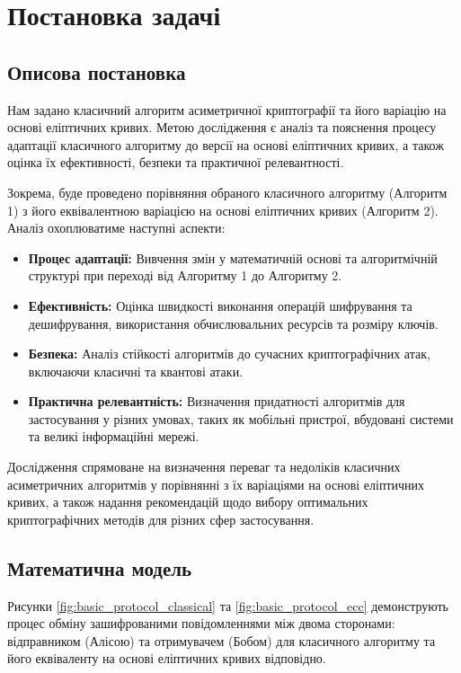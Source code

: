 \documentclass[12pt]{report}
\theoremstyle{definition}
\theoremstyle{plain}
\begin{document}
\chapter{Постановка задачі}

\section{Описова постановка}

Нам задано класичний алгоритм асиметричної криптографії та його варіацію на основі еліптичних кривих. Метою дослідження є аналіз та пояснення процесу адаптації класичного алгоритму до версії на основі еліптичних кривих, а також оцінка їх ефективності, безпеки та практичної релевантності.

Зокрема, буде проведено порівняння обраного класичного алгоритму (Алгоритм 1) з його еквівалентною варіацією на основі еліптичних кривих (Алгоритм 2). Аналіз охоплюватиме наступні аспекти:
\begin{itemize}
    \item \textbf{Процес адаптації:} Вивчення змін у математичній основі та алгоритмічній структурі при переході від Алгоритму 1 до Алгоритму 2.
    \item \textbf{Ефективність:} Оцінка швидкості виконання операцій шифрування та дешифрування, використання обчислювальних ресурсів та розміру ключів.
    \item \textbf{Безпека:} Аналіз стійкості алгоритмів до сучасних криптографічних атак, включаючи класичні та квантові атаки.
    \item \textbf{Практична релевантність:} Визначення придатності алгоритмів для застосування у різних умовах, таких як мобільні пристрої, вбудовані системи та великі інформаційні мережі.
\end{itemize}

Дослідження спрямоване на визначення переваг та недоліків класичних асиметричних алгоритмів у порівнянні з їх варіаціями на основі еліптичних кривих, а також надання рекомендацій щодо вибору оптимальних криптографічних методів для різних сфер застосування.

\section{Математична модель}

Рисунки \ref{fig:basic_protocol_classical} та \ref{fig:basic_protocol_ecc} демонструють процес обміну зашифрованими повідомленнями між двома сторонами: відправником (Алісою) та отримувачем (Бобом) для класичного алгоритму та його еквіваленту на основі еліптичних кривих відповідно.
\end{document}
